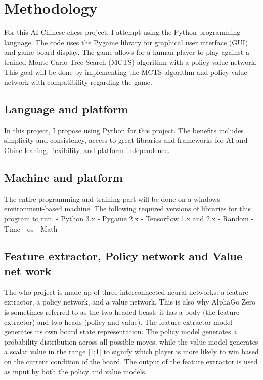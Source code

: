 \documentclass[10pt,twocolumn]{article}
\begin{document}
\section{Methodology}
    For this AI-Chinese chess project, I attempt using the Python programming language. The code uses the Pygame library for graphical user interface (GUI) and game board display. The game allows for a human player to play against a trained Monte Carlo Tree Search (MCTS) algorithm with a policy-value network. This goal will be done by implementing the MCTS algorithm and policy-value network with compatibility regarding the game. 
    
\subsection{Language and platform}
    In this project, I propose using Python for this project. The benefits includes simplicity and consistency, access to great libraries and frameworks for AI and Chine leaning, flexibility, and platform independence.
    
\subsection{Machine and platform}
    The entire programming and training part will be done on a windows environment-based machine. The following required versions of libraries for this program to run.
    - Python 3.x
    - Pygame 2.x
    - Tensorflow 1.x and 2.x
    - Random
    - Time
    - os 
    - Math

\subsection{Feature extractor, Policy network and Value net work}
    The who project is made up of three interconnected neural networks: a feature extractor, a policy network, and a value network. This is also why AlphaGo Zero is sometimes referred to as the two-headed beast: it has a body (the feature extractor) and two heads (policy and value). The feature extractor model generates its own board state representation. The policy model generates a probability distribution across all possible moves, while the value model generates a scalar value in the range [1;1] to signify which player is more likely to win based on the current condition of the board. The output of the feature extractor is used as input by both the policy and value models.\cite{Java}
\end{document}
